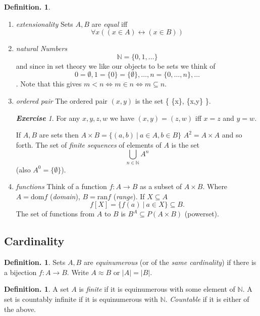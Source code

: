 \documentclass[a4paper,oneside,11pt,DIV=12,parskip=half]{scrartcl}
\newcommand{\N}{\mathbb N}
\theoremstyle{plain}
\theoremstyle{definition}
\newtheorem{definition}[theorem]{Definition.}
\newtheorem{remark, definition}[theorem]{Remark and Definition.}
\newtheorem{lemma, definition}[theorem]{Lemma and Definition.}
\newtheorem{theorem, definition}[theorem]{Theorem and Definition.}
\theoremstyle{remark}
\newtheorem*{exercise}{\textbf{Exercise}}
\newtheorem*{remark, example}{\textbf{Remark and Exercise}}
\begin{document}
\begin{definition}
\begin{enumerate}
    \item  \emph{extensionality} Sets $A,B$ are \emph{equal} iff
        \[ \forall x ((x \in A) \leftrightarrow (x \in B)) \]
    \item \emph{natural Numbers}
        \[ \N = \{0,1,\dots \} \] and since in set theory we like our objects to be sets we think of
            \[ 0 = \emptyset, 1 = \{ 0 \} = \{\emptyset\}, \dots, n = \{ 0,\dots, n \}, \dots \].
    Note that this gives $m < n \Leftrightarrow m \in n \Leftrightarrow m \subseteq n$.
    \item \emph{ordered pair}
    The ordered pair $(x,y)$ is the set
        \{ \{x\}, \{x,y\} \}.
    \begin{exercise}
        For any $x,y,z,w$ we have $(x,y) = (z,w)$ iff $x = z$ and $y = w$.
    \end{exercise}
    If $A,B$ are sets then $A \times B = \{ (a,b)~|~ a \in A, b \in B \}$
    $A^2 = A \times A$ and so forth.
    The set of \emph{finite sequences} of elements of $A$ is the set 
        \[ \bigcup_{n \in \N} A^n \]
    (also $A^0=\{\emptyset\}$).
    \item \emph{functions}
    Think of a function $f: A \rightarrow B$ as a subset of $A \times B$. Where $A = \mathrm{dom}f$ (\emph{domain}), $B = \mathrm{ran}f$ (\emph{range}).
    If $X \subseteq A$
        \[ f[X] = \{ f(a) ~|~ a \in X \} \subseteq B. \]
    The set of functions from $A$ to $B$ is $B^A \subseteq P(A \times B)$ (powerset).
\end{enumerate}
\end{definition}

\subsection{Cardinality}
\begin{definition}
Sets $A,B$ are \emph{equinumerous} (or of the \emph{same cardinality}) if there is a bijection $f: A \rightarrow B$. Write $A \approx B$ or $|A|=|B|$.
\end{definition}

\begin{definition}
A set $A$ is \emph{finite} if it is equinumerous with some element of $\N$. A set is countably infinite if it is equinumerous with $\N$. \emph{Countable} if it is either of the above.
\end{definition}
\end{document}
